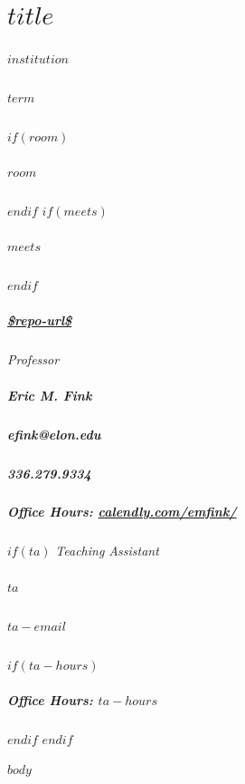 \documentclass[11pt,letterpaper,twoside]{article}
\begin{document}
\thispagestyle{empty}

\color{OffBlack}

\section{$title$}

\begin{footnotesize}
\subparagraph{$institution$}
\subparagraph{$term$}
$if(room)$\subparagraph{$room$}$endif$
$if(meets)$\subparagraph{$meets$}$endif$
\subparagraph{\url{$repo-url$}}
\vspace{1em}

{\itshape{Professor}}
\subparagraph{Eric M. Fink} 
\subparagraph{efink@elon.edu}
\subparagraph{336.279.9334} 
\subparagraph{Office Hours: {\url{calendly.com/emfink/}}}
$if(ta)$
\vspace{1em}
{\itshape{Teaching Assistant}}
\subparagraph{$ta$}
\subparagraph{$ta-email$}
$if(ta-hours)$\subparagraph{Office Hours: $ta-hours$}$endif$
$endif$
\end{footnotesize}

\vspace{1em}


$body$
\end{document}
